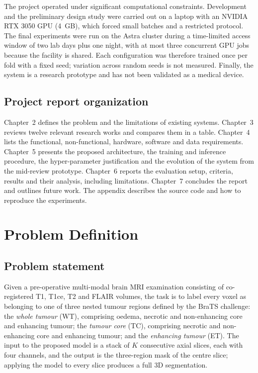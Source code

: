 The project operated under significant computational constraints. Development and the preliminary design study were carried out on a laptop with an NVIDIA RTX 3050 GPU (4~GB), which forced small batches and a restricted protocol. The final experiments were run on the Astra cluster during a time-limited access window of two lab days plus one night, with at most three concurrent GPU jobs because the facility is shared. Each configuration was therefore trained once per fold with a fixed seed; variation across random seeds is not measured. Finally, the system is a research prototype and has not been validated as a medical device.

\section{Project report organization}
Chapter~2 defines the problem and the limitations of existing systems. Chapter~3 reviews twelve relevant research works and compares them in a table. Chapter~4 lists the functional, non-functional, hardware, software and data requirements. Chapter~5 presents the proposed architecture, the training and inference procedure, the hyper-parameter justification and the evolution of the system from the mid-review prototype. Chapter~6 reports the evaluation setup, criteria, results and their analysis, including limitations. Chapter~7 concludes the report and outlines future work. The appendix describes the source code and how to reproduce the experiments.

\clearpage
\chapter{Problem Definition}
\section{Problem statement}
Given a pre-operative multi-modal brain MRI examination consisting of co-registered T1, T1ce, T2 and FLAIR volumes, the task is to label every voxel as belonging to one of three nested tumour regions defined by the BraTS challenge: the \emph{whole tumour} (WT), comprising oedema, necrotic and non-enhancing core and enhancing tumour; the \emph{tumour core} (TC), comprising necrotic and non-enhancing core and enhancing tumour; and the \emph{enhancing tumour} (ET). The input to the proposed model is a stack of $K$ consecutive axial slices, each with four channels, and the output is the three-region mask of the centre slice; applying the model to every slice produces a full 3D segmentation.


